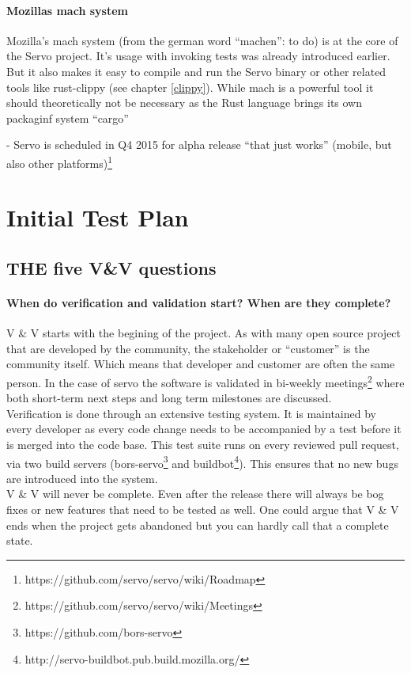 \documentclass{scrartcl}
\begin{document}
\paragraph{Mozillas mach system}
Mozilla's mach system (from the german word ``machen'': to do) is at the core of the Servo project. It's usage with invoking tests was already introduced earlier. But it also makes it easy to compile and run the Servo binary or other related tools like rust-clippy (see chapter \ref{clippy}). While mach is a powerful tool it should theoretically not be necessary as the Rust language brings its own packaginf system ``cargo''


- Servo is scheduled in Q4 2015 for alpha release ``that just works'' (mobile, but also other platforms)\footnote{https://github.com/servo/servo/wiki/Roadmap}


\section{Initial Test Plan}
\subsection{THE five V\&V questions}
\paragraph{When do verification and validation start? When are they complete?}
V \& V starts with the begining of the project. As with many open source project that are developed by the community, the stakeholder or ``customer'' is the community itself. Which means that developer and customer are often the same person. In the case of servo the software is validated in bi-weekly meetings\footnote{https://github.com/servo/servo/wiki/Meetings} where both short-term next steps and long term milestones are discussed.\\
  
  Verification is done through an extensive testing system. It is maintained by every developer as every code change needs to be accompanied by a test before it is merged into the code base. This test suite runs on every reviewed pull request, via two build servers (bors-servo\footnote{https://github.com/bors-servo} and buildbot\footnote{http://servo-buildbot.pub.build.mozilla.org/}). This ensures that no new bugs are introduced into the system.\\
  
V \& V will never be complete. Even after the release there will always be bog fixes or new features that need to be tested as well. One could argue that V \& V ends when the project gets abandoned but you can hardly call that a complete state.
\end{document}
